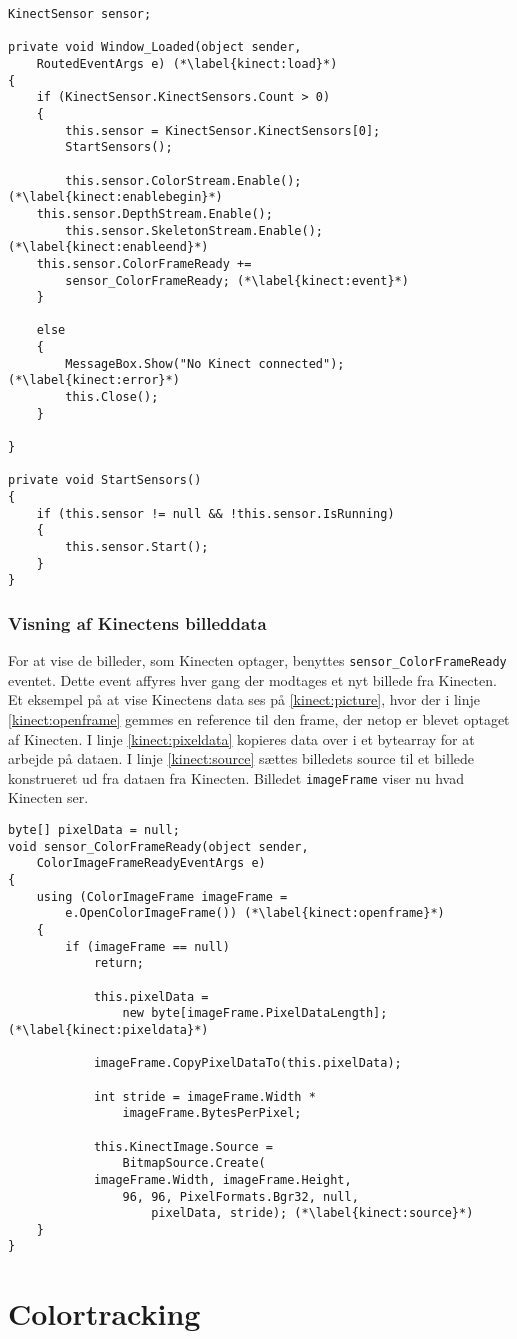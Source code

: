\begin{lstlisting}[style=csharp, label=kinect:initialisering, caption={Initialisering af en Kinect sensor.}]
KinectSensor sensor;

private void Window_Loaded(object sender,
	RoutedEventArgs e) (*\label{kinect:load}*)
{
    if (KinectSensor.KinectSensors.Count > 0)
    {
        this.sensor = KinectSensor.KinectSensors[0];
        StartSensors();
        
        this.sensor.ColorStream.Enable();(*\label{kinect:enablebegin}*)    
	this.sensor.DepthStream.Enable();
        this.sensor.SkeletonStream.Enable();(*\label{kinect:enableend}*)
	this.sensor.ColorFrameReady += 
		sensor_ColorFrameReady; (*\label{kinect:event}*)
    }

    else
    {
        MessageBox.Show("No Kinect connected"); (*\label{kinect:error}*)
        this.Close();
    }

}

private void StartSensors()
{
    if (this.sensor != null && !this.sensor.IsRunning)
    {
        this.sensor.Start();
    }
}
\end{lstlisting}

\subsubsection{Visning af Kinectens billeddata}
For at vise de billeder, som Kinecten optager, benyttes \lstinline[style=csharp]!sensor_ColorFrameReady! eventet. 
Dette event affyres hver gang der modtages et nyt billede fra Kinecten. 
Et eksempel på at vise Kinectens data ses på \cref{kinect:picture}, hvor der i linje \ref{kinect:openframe} gemmes en reference til den frame, der netop er blevet optaget af Kinecten.
I linje \ref{kinect:pixeldata} kopieres data over i et bytearray for at arbejde på dataen. 
I linje \ref{kinect:source} sættes billedets source til et billede konstrueret ud fra dataen fra Kinecten.
Billedet \lstinline[style=csharp]|imageFrame| viser nu hvad Kinecten ser.

\begin{lstlisting}[style=csharp,caption={Visning af billeddata fra Kinectens RGB-kamera.}, label=kinect:picture]
byte[] pixelData = null;
void sensor_ColorFrameReady(object sender,
	ColorImageFrameReadyEventArgs e)
{
    using (ColorImageFrame imageFrame = 
    	e.OpenColorImageFrame()) (*\label{kinect:openframe}*)
    {
        if (imageFrame == null)
            return;

            this.pixelData = 
            	new byte[imageFrame.PixelDataLength];(*\label{kinect:pixeldata}*)

            imageFrame.CopyPixelDataTo(this.pixelData);

            int stride = imageFrame.Width *
            	imageFrame.BytesPerPixel;

            this.KinectImage.Source = 
            	BitmapSource.Create(
            imageFrame.Width, imageFrame.Height, 
            	96, 96, PixelFormats.Bgr32, null, 
            		pixelData, stride); (*\label{kinect:source}*)
    }
}    
\end{lstlisting}

\section{Colortracking}
